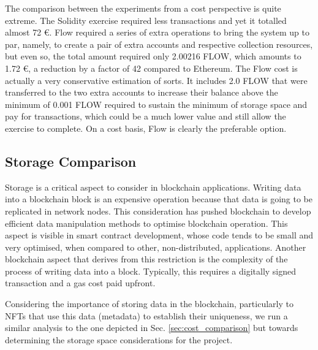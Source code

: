 \documentclass[../NFTComp_IEEE.tex]{subfiles}
\begin{document}
\par
The comparison between the experiments from a cost perspective is quite extreme. The Solidity exercise required less transactions and yet it totalled almost 72 €. Flow required a series of extra operations to bring the system up to par, namely, to create a pair of extra accounts and respective collection resources, but even so, the total amount required only 2.00216 FLOW, which amounts to 1.72 €, a reduction by a factor of 42 compared to Ethereum. The Flow cost is actually a very conservative estimation of sorts. It includes 2.0 FLOW that were transferred to the two extra accounts to increase their balance above the minimum of 0.001 FLOW required to sustain the minimum of storage space and pay for transactions, which could be a much lower value and still allow the exercise to complete. On a cost basis, Flow is clearly the preferable option.

\subsection{Storage Comparison}
Storage is a critical aspect to consider in blockchain applications. Writing data into a blockchain block is an expensive operation because that data is going to be replicated in network nodes. This consideration has pushed blockchain to develop efficient data manipulation methods to optimise blockchain operation. This aspect is visible in smart contract development, whose code tends to be small and very optimised, when compared to other, non-distributed, applications. Another blockchain aspect that derives from this restriction is the complexity of the process of writing data into a block. Typically, this requires a digitally signed transaction and a gas cost paid upfront.
\par
Considering the importance of storing data in the blockchain, particularly to NFTs that use this data (metadata) to establish their uniqueness, we run a similar analysis to the one depicted in Sec. \ref{sec:cost_comparison} but towards determining the storage space considerations for the project.
\end{document}
